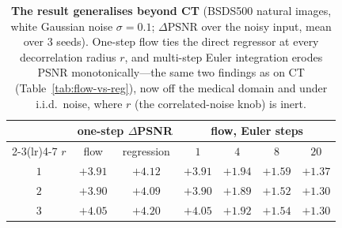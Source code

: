 \begin{table}[t]
  \centering
  \small
  \caption{\textbf{The result generalises beyond CT} (BSDS500 natural images,
           white Gaussian noise $\sigma{=}0.1$; $\Delta$PSNR over the noisy input,
           mean over $3$ seeds).  One-step flow ties the direct regressor at every
           decorrelation radius $r$, and multi-step Euler integration erodes PSNR
           monotonically---the same two findings as on CT
           (Table~\ref{tab:flow-vs-reg}), now off the medical domain and under
           i.i.d.\ noise, where $r$ (the correlated-noise knob) is inert.}
  \label{tab:natural}
  \begin{tabular}{ccccccc}
    \toprule
    & \multicolumn{2}{c}{one-step $\Delta$PSNR} & \multicolumn{4}{c}{flow, Euler steps} \\
    \cmidrule(lr){2-3}\cmidrule(lr){4-7}
    $r$ & flow & regression & $1$ & $4$ & $8$ & $20$ \\
    \midrule
    $1$ & $+3.91$ & $+4.12$ & $+3.91$ & $+1.94$ & $+1.59$ & $+1.37$ \\
    $2$ & $+3.90$ & $+4.09$ & $+3.90$ & $+1.89$ & $+1.52$ & $+1.30$ \\
    $3$ & $+4.05$ & $+4.20$ & $+4.05$ & $+1.92$ & $+1.54$ & $+1.30$ \\
    \bottomrule
  \end{tabular}
\end{table}

